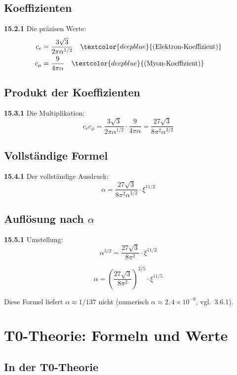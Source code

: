 \subsection{Koeffizienten}

\noindent \textbf{15.2.1} Die präzisen Werte:
\begin{align*}
	c_e &= \frac{3\sqrt{3}}{2\pi\alpha^{1/2}} \quad \textcolor{deepblue}{\text{(Elektron-Koeffizient)}} \\
	c_\mu &= \frac{9}{4\pi\alpha} \quad \textcolor{deepblue}{\text{(Myon-Koeffizient)}}
\end{align*}

\subsection{Produkt der Koeffizienten}

\noindent \textbf{15.3.1} Die Multiplikation:
\[
c_e c_\mu = \frac{3\sqrt{3}}{2\pi\alpha^{1/2}} \cdot \frac{9}{4\pi\alpha} = \frac{27\sqrt{3}}{8\pi^2\alpha^{3/2}}
\]

\subsection{Vollständige Formel}

\noindent \textbf{15.4.1} Der vollständige Ausdruck:
\[
\alpha = \frac{27\sqrt{3}}{8\pi^2\alpha^{3/2}} \cdot \xi^{11/2}
\]

\subsection{Auflösung nach $\alpha$}

\noindent \textbf{15.5.1} Umstellung:
\[
\alpha^{5/2} = \frac{27\sqrt{3}}{8\pi^2} \cdot \xi^{11/2}
\]

\[
\alpha = \left(\frac{27\sqrt{3}}{8\pi^2}\right)^{2/5} \cdot \xi^{11/5}
\]

Diese Formel liefert $\alpha \approx 1/137$ nicht (numerisch $\alpha \approx 2{,}4\times10^{-9}$, vgl.\ 3.6.1).


\section{T0-Theorie: Formeln und Werte}

\subsection{In der T0-Theorie}

